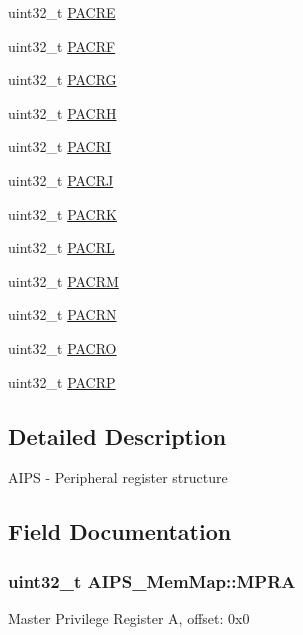 \begin{DoxyCompactItemize}
\item 
uint32\+\_\+t \hyperlink{struct_a_i_p_s___mem_map_ad1f2d4b98aea7609a045558a9dc20f7b}{P\+A\+C\+R\+E}
\item 
uint32\+\_\+t \hyperlink{struct_a_i_p_s___mem_map_aedfe0bcf944c983903be902a97a1f59a}{P\+A\+C\+R\+F}
\item 
uint32\+\_\+t \hyperlink{struct_a_i_p_s___mem_map_a7eb01b8a7f5cbdd90e2cfc1103dc818e}{P\+A\+C\+R\+G}
\item 
uint32\+\_\+t \hyperlink{struct_a_i_p_s___mem_map_af4ac7a20bb8f381f2f77e21ed14d5e91}{P\+A\+C\+R\+H}
\item 
uint32\+\_\+t \hyperlink{struct_a_i_p_s___mem_map_a75787ffd284dd47814093fbe8d28232d}{P\+A\+C\+R\+I}
\item 
uint32\+\_\+t \hyperlink{struct_a_i_p_s___mem_map_aa8170562fdbb48e8ade84f0992479a98}{P\+A\+C\+R\+J}
\item 
uint32\+\_\+t \hyperlink{struct_a_i_p_s___mem_map_a62015f5d8f85dd001390b0168aa7389f}{P\+A\+C\+R\+K}
\item 
uint32\+\_\+t \hyperlink{struct_a_i_p_s___mem_map_a564d95efed1747932b25675342cac085}{P\+A\+C\+R\+L}
\item 
uint32\+\_\+t \hyperlink{struct_a_i_p_s___mem_map_a30e7ebe0ffb0e9d97cbfa85d65e17cbb}{P\+A\+C\+R\+M}
\item 
uint32\+\_\+t \hyperlink{struct_a_i_p_s___mem_map_a83bf08b950901b8f6d7ef2ceb960baa8}{P\+A\+C\+R\+N}
\item 
uint32\+\_\+t \hyperlink{struct_a_i_p_s___mem_map_a5892f2b025c43f875f1c88e3a8f6da30}{P\+A\+C\+R\+O}
\item 
uint32\+\_\+t \hyperlink{struct_a_i_p_s___mem_map_af6d96671be0c664042ec003595ac405e}{P\+A\+C\+R\+P}
\end{DoxyCompactItemize}


\subsection{Detailed Description}
A\+I\+P\+S -\/ Peripheral register structure 

\subsection{Field Documentation}
\hypertarget{struct_a_i_p_s___mem_map_a5ee5a8f31c77bbd35f1bb5f7a1f92c59}{}
\subsubsection[{M\+P\+R\+A}]{\setlength{\rightskip}{0pt plus 5cm}uint32\+\_\+t A\+I\+P\+S\+\_\+\+Mem\+Map\+::\+M\+P\+R\+A}\label{struct_a_i_p_s___mem_map_a5ee5a8f31c77bbd35f1bb5f7a1f92c59}
Master Privilege Register A, offset\+: 0x0 \hypertarget{struct_a_i_p_s___mem_map_a4b1afda7928f39099d6cc26a0b17da11}{}
